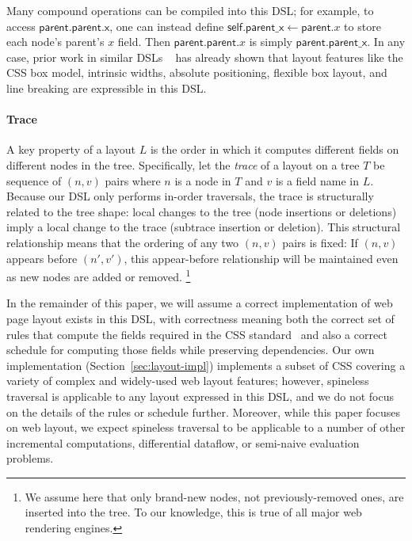 Many compound operations can be compiled into this DSL;
  for example, to access $\mathsf{parent}.\mathsf{parent}.\mathsf{x}$,
  one can instead define
  $\mathsf{self}.\mathsf{parent\_x} \gets \mathsf{parent}.x$
  to store each node's parent's $x$ field.
Then $\mathsf{parent}.\mathsf{parent}.x$
  is simply $\mathsf{parent}.\mathsf{parent\_x}$.
In any case, prior work in similar DSLs%
  ~\cite{meyerovich-1, meyerovich-2, cassius-1,
  cassius-2, cassius-3, yufeng-1, yufeng-2}
  has already shown that layout features
  like the CSS box model, intrinsic widths,
  absolute positioning, flexible box layout,
  and line breaking are expressible in this DSL.

\paragraph{Trace}
\label{par:trace}
A key property of a layout $L$
  is the order in which it computes
  different fields on different nodes in the tree.
Specifically, let the \emph{trace} of a layout on a tree $T$
  be sequence of $(n, v)$ pairs
  where $n$ is a node in $T$ and $v$ is a field name in $L$.
Because our DSL only performs in-order traversals,
  the trace is structurally related to the tree shape:
  local changes to the tree (node insertions or deletions)
  imply a local change to the trace (subtrace insertion or deletion).
This structural relationship means that the ordering of any two $(n, v)$ pairs is fixed:
If $(n, v)$ appears before $(n', v')$,
  this appear-before relationship will be maintained even as new nodes are added or removed.%
\footnote{
  We assume here that
    only brand-new nodes, not previously-removed ones,
    are inserted into the tree.
  To our knowledge, this is true of all major web rendering engines.
}


In the remainder of this paper,
  we will assume a correct implementation
  of web page layout exists in this DSL,
  with correctness meaning both the correct set of rules
  that compute the fields required
  in the CSS standard~\cite{css}
  and also a correct schedule for computing those fields
  while preserving dependencies.
Our own implementation (Section~\ref{sec:layout-impl})
  implements a subset of CSS covering a variety
  of complex and widely-used web layout features;
  however, spineless traversal is applicable
  to any layout expressed in this DSL,
  and we do not focus on the details
  of the rules or schedule further.
Moreover, while this paper focuses on web layout,
  we expect spineless traversal to be applicable
  to a number of other incremental computations,
  differential dataflow, or semi-naive evaluation problems.

